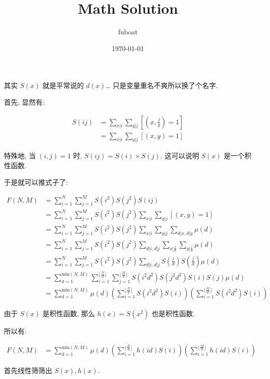 \documentclass[12pt,a4paper]{article}
\date{\today}
\author{fuboat}
\title{Math Solution}
\begin{document}
\maketitle

其实 $S(x)$ 就是平常说的 $d(x)$\ldots{} 只是变量重名不爽所以换了个名字.

首先, 显然有:

\begin{align*}
S(ij) &= \sum_{x|i} \sum_{y|j} [(x, \frac{j}{y}) = 1] \\
      &= \sum_{x|i} \sum_{y|j} [(x, y) = 1]
\end{align*}

特殊地, 当 $(i,j) = 1$ 时, $S(ij) = S(i) \times S(j)$.
这可以说明 $S(x)$ 是一个积性函数.

于是就可以推式子了:

\begin{align*}
F(N,M) &= \sum_{i=1}^{N} \sum_{j=1}^{M} S(i^2) S(j^2) S(ij) \\
       &= \sum_{i=1}^{N} \sum_{j=1}^{M} S(i^2) S(j^2) \sum_{x|i} \sum_{y|j} [(x, y) = 1] \\
       &= \sum_{i=1}^{N} \sum_{j=1}^{M} S(i^2) S(j^2) \sum_{x|i} \sum_{y|j} \sum_{d|x, d|y} \mu(d) \\
       &= \sum_{i=1}^{N} \sum_{j=1}^{M} S(i^2) S(j^2) \sum_{d|i, d|j} \sum_{x|\frac{i}{d}} \sum_{y|\frac{j}{d}} \mu(d) \\
       &= \sum_{i=1}^{N} \sum_{j=1}^{M} S(i^2) S(j^2) \sum_{d|i, d|j} S(\frac{i}{d}) S(\frac{j}{d}) \mu(d) \\
       &= \sum_{d=1}^{\text{min}(N,M)} \sum_{i=1}^{\lfloor\frac{N}{d}\rfloor} \sum_{j=1}^{\lfloor\frac{M}{d}\rfloor} S(i^2d^2) S(j^2d^2) S(i) S(j) \mu(d) \\
       &= \sum_{d=1}^{\text{min}(N,M)} \mu(d) \left(\sum_{i=1}^{\lfloor\frac{N}{d}\rfloor} S(i^2d^2) S(i)\right) \left(\sum_{i=1}^{\lfloor\frac{M}{d}\rfloor} S(i^2d^2) S(i)\right)
\end{align*}

由于 $S(x)$ 是积性函数, 那么 $h(x) = S(x^2)$ 也是积性函数.

所以有:

\begin{align*}
F(N,M) &= \sum_{d=1}^{\text{min}(N,M)} \mu(d) \left(\sum_{i=1}^{\lfloor\frac{N}{d}\rfloor} h(id) S(i)\right) \left(\sum_{i=1}^{\lfloor\frac{M}{d}\rfloor} h(id) S(i)\right)
\end{align*}

首先线性筛筛出 $S(x), h(x)$.
\end{document}
